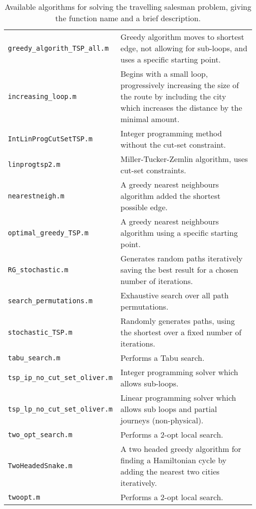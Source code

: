 \begin{table}[hbt]
\begin{center}
\begin{tabularx}{\textwidth}{|L{0.4\textwidth}|X|}
\hdashline
\texttt{greedy\_algorith\_TSP\_all.m} & Greedy algorithm moves to shortest edge, not allowing for sub-loops, and uses a specific starting point. \\
\hdashline
\texttt{increasing\_loop.m} & Begins with a small loop, progressively increasing the size of the route by including the city which increases the distance by the minimal amount. \\
\hdashline
\texttt{IntLinProgCutSetTSP.m} & Integer programming method without the cut-set constraint. \\
\hdashline
\texttt{linprogtsp2.m} &  Miller-Tucker-Zemlin  algorithm, uses cut-set constraints. \\
\hdashline
\texttt{nearestneigh.m} &  A greedy nearest neighbours algorithm added the shortest possible edge.  \\
\hdashline
\texttt{optimal\_greedy\_TSP.m} &  A greedy nearest neighbours algorithm using a specific starting point.  \\
\hdashline
\texttt{RG\_stochastic.m} &  Generates random paths iteratively saving the best result for a chosen number of iterations. \\
\hdashline
\texttt{search\_permutations.m} &  Exhaustive search over all path permutations. \\
\hdashline
\texttt{stochastic\_TSP.m} &  Randomly generates paths, using the shortest over a fixed number of iterations. \\
\hdashline
\texttt{tabu\_search.m} &  Performs a Tabu search. \\
\hdashline
\texttt{tsp\_ip\_no\_cut\_set\_oliver.m} & Integer programming solver which allows sub-loops.\\
\hdashline
\texttt{tsp\_lp\_no\_cut\_set\_oliver.m} & Linear programming solver which allows sub loops and partial journeys (non-physical).\\
\texttt{two\_opt\_search.m} &  Performs a 2-opt local search. \\
\hdashline
\texttt{TwoHeadedSnake.m} &  A two headed greedy algorithm for finding a Hamiltonian cycle by adding the nearest two cities iteratively. \\
\hdashline
\texttt{twoopt.m} &  Performs a 2-opt local search. \\
\hline
\end{tabularx}
\caption{Available algorithms for solving the travelling salesman problem, giving the function name and a brief description.}
\label{tab:brief_algorithm_descriptions}
\end{center}
\end{table}

\clearpage
